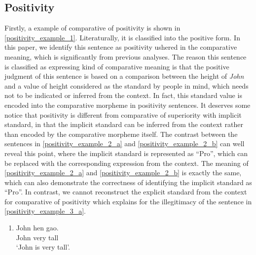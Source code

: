 \documentclass{ctexart}
\begin{document}
\subsection{Positivity}

\noindent
Firstly, a example of comparative of positivity is shown in \ref{positivity_example_1}. Literaturally, it is classified into the positive form. In this paper, we identify this sentence as positivity ushered in the comparative meaning, which is significantly from previous analyses. The reason this sentence is classified as expressing kind of comparative meaning is that the positive judgment of this sentence is based on a comparison between the height of \textit{John} and a value of height considered as the standard by people in mind, which needs not to be indicated or inferred from the context. In fact, this standard value is encoded into the comparative morpheme in positivity sentences. It deserves some notice that positivity is different from comparative of superiority with implicit standard, in that the implicit standard can be inferred from the context rather than encoded by the comparative morpheme itself. The contrast between the sentences in \ref{positivity_example_2_a} and \ref{positivity_example_2_b} can well reveal this point, where the implicit standard is represented as ``Pro'', which can be replaced with the corresponding expression from the context. The meaning of \ref{positivity_example_2_a} and \ref{positivity_example_2_b} is exactly the same, which can also demonstrate the correctness of identifying the implicit standard as ``Pro''. In contrast, we cannot reconstruct the explicit standard from the context for comparative of positivity which explains for the illegitimacy of the sentence in \ref{positivity_example_3_a}.

\begin{enumerate}
    \item \label{positivity_example_1}
    John hen gao.  \\
    John very tall \\
    `John is very tall'.
\end{enumerate}
\end{document}
